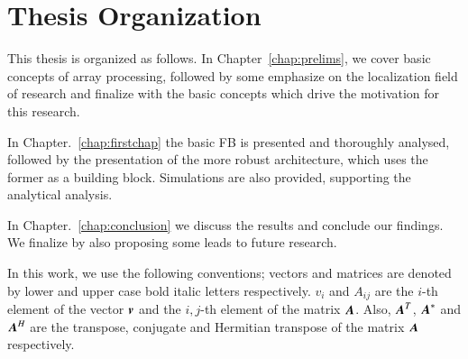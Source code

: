 \section{Thesis Organization}
\par This thesis is organized as follows.
In Chapter~\ref{chap:prelims}, we cover basic concepts of array processing, followed by some emphasize on the localization field of research and finalize with the basic concepts which drive the motivation for this research.
\par In Chapter.~\ref{chap:firstchap} the basic FB is presented and thoroughly analysed, followed by the presentation of the more robust architecture, which uses the former as a building block.
Simulations are also provided, supporting the analytical analysis.
\par In Chapter.~\ref{chap:conclusion} we discuss the results and conclude our findings. We finalize by also proposing some leads to future research.
\par In this work, we use the following conventions; vectors and matrices are denoted by lower and upper case bold italic letters respectively. 
$v_{i}$ and $A_{ij}$ are the $i$-th element of the vector $\boldsymbol{v}$ and the $i,j$-th element of the matrix $\boldsymbol{A}$.
Also, $\boldsymbol{A}^{T}$, $\boldsymbol{A}^{*}$ and $\boldsymbol{A}^{H}$ are the transpose, conjugate and Hermitian transpose of the matrix $\boldsymbol{A}$ respectively.